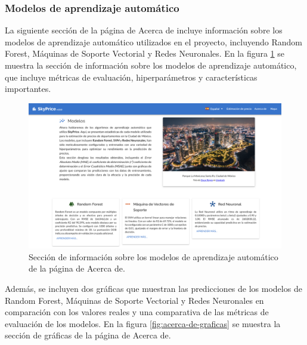 \subsubsection{Modelos de aprendizaje automático}
La siguiente sección de la página de Acerca de incluye información sobre los modelos
de aprendizaje automático utilizados en el proyecto, incluyendo Random Forest, Máquinas
de Soporte Vectorial y Redes Neuronales. En la figura \ref{fig:acerca-de-modelos} se
muestra la sección de información sobre los modelos de aprendizaje automático, que
incluye métricas de evaluación, hiperparámetros y características importantes.

\begin{figure}[H]
    \centering
    \includegraphics[width=1.0\textwidth]{imagenes/05-implementacion/interfaz-grafica/acerca-de-modelos.png}
    \caption{Sección de información sobre los modelos de aprendizaje automático de la página de Acerca de.}
    \label{fig:acerca-de-modelos}
\end{figure}

Además, se incluyen dos gráficas que muestran las predicciones de los modelos de
Random Forest, Máquinas de Soporte Vectorial y Redes Neuronales en comparación con
los valores reales y una comparativa de las métricas de evaluación de los modelos.
En la figura \ref{fig:acerca-de-graficas} se muestra la sección de gráficas de la
página de Acerca de.

